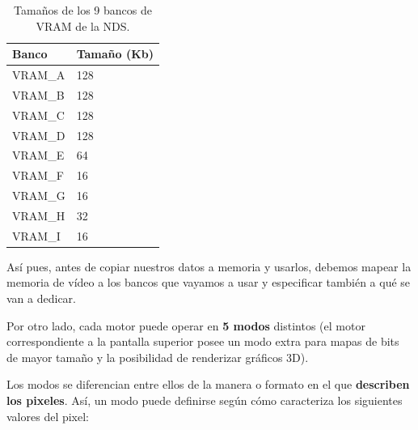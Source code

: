 \begin{table}[]
\centering
\begin{tabular}{|l|l|}
\hline
{\color[HTML]{000000} \textbf{Banco}} & {\color[HTML]{000000} \textbf{Tamaño (Kb)}} \\ \hline
{\color[HTML]{000000} VRAM\_A}        & {\color[HTML]{000000} 128}                  \\ \hline
{\color[HTML]{000000} VRAM\_B}        & {\color[HTML]{000000} 128}                  \\ \hline
{\color[HTML]{000000} VRAM\_C}        & {\color[HTML]{000000} 128}                  \\ \hline
{\color[HTML]{000000} VRAM\_D}        & {\color[HTML]{000000} 128}                  \\ \hline
{\color[HTML]{000000} VRAM\_E}        & {\color[HTML]{000000} 64}                   \\ \hline
{\color[HTML]{000000} VRAM\_F}        & {\color[HTML]{000000} 16}                   \\ \hline
{\color[HTML]{000000} VRAM\_G}        & {\color[HTML]{000000} 16}                   \\ \hline
{\color[HTML]{000000} VRAM\_H}        & {\color[HTML]{000000} 32}                   \\ \hline
{\color[HTML]{000000} VRAM\_I}        & {\color[HTML]{000000} 16}                   \\ \hline
\end{tabular}
\caption{Tamaños de los 9 bancos de VRAM de la NDS.}
\end{table}

\vspace{0.5cm}

Así pues, antes de copiar nuestros datos a memoria y usarlos, debemos mapear la memoria de vídeo a los bancos que vayamos a usar y especificar también a qué se van a dedicar.

\vspace{0.5cm}

Por otro lado, cada motor puede operar en \textbf{5 modos} distintos (el motor correspondiente a la pantalla superior posee un modo extra para mapas de bits de mayor tamaño y la posibilidad de renderizar gráficos 3D).

\vspace{0.5cm}

Los modos se diferencian entre ellos de la manera o formato en el que \textbf{describen los pixeles}. Así, un modo puede definirse según cómo caracteriza los siguientes valores del pixel:

